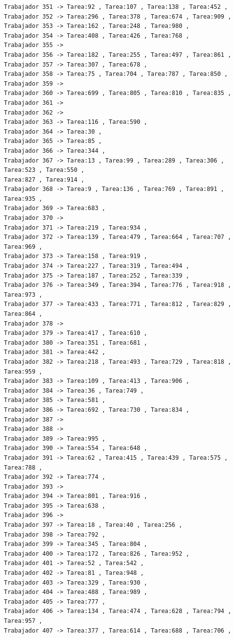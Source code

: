 \documentclass{article}
\begin{document}
\begin{lstlisting}
Trabajador 351 -> Tarea:92 , Tarea:107 , Tarea:138 , Tarea:452 , 
Trabajador 352 -> Tarea:296 , Tarea:378 , Tarea:674 , Tarea:909 , 
Trabajador 353 -> Tarea:162 , Tarea:248 , Tarea:980 , 
Trabajador 354 -> Tarea:408 , Tarea:426 , Tarea:768 , 
Trabajador 355 -> 
Trabajador 356 -> Tarea:182 , Tarea:255 , Tarea:497 , Tarea:861 , 
Trabajador 357 -> Tarea:307 , Tarea:678 , 
Trabajador 358 -> Tarea:75 , Tarea:704 , Tarea:787 , Tarea:850 , 
Trabajador 359 -> 
Trabajador 360 -> Tarea:699 , Tarea:805 , Tarea:810 , Tarea:835 , 
Trabajador 361 -> 
Trabajador 362 -> 
Trabajador 363 -> Tarea:116 , Tarea:590 , 
Trabajador 364 -> Tarea:30 , 
Trabajador 365 -> Tarea:85 , 
Trabajador 366 -> Tarea:344 , 
Trabajador 367 -> Tarea:13 , Tarea:99 , Tarea:289 , Tarea:306 , Tarea:523 , Tarea:550 , 
Tarea:827 , Tarea:914 , 
Trabajador 368 -> Tarea:9 , Tarea:136 , Tarea:769 , Tarea:891 , Tarea:935 , 
Trabajador 369 -> Tarea:683 , 
Trabajador 370 -> 
Trabajador 371 -> Tarea:219 , Tarea:934 , 
Trabajador 372 -> Tarea:139 , Tarea:479 , Tarea:664 , Tarea:707 , Tarea:969 , 
Trabajador 373 -> Tarea:158 , Tarea:919 , 
Trabajador 374 -> Tarea:227 , Tarea:319 , Tarea:494 , 
Trabajador 375 -> Tarea:187 , Tarea:252 , Tarea:339 , 
Trabajador 376 -> Tarea:349 , Tarea:394 , Tarea:776 , Tarea:918 , Tarea:973 , 
Trabajador 377 -> Tarea:433 , Tarea:771 , Tarea:812 , Tarea:829 , Tarea:864 , 
Trabajador 378 -> 
Trabajador 379 -> Tarea:417 , Tarea:610 , 
Trabajador 380 -> Tarea:351 , Tarea:681 , 
Trabajador 381 -> Tarea:442 , 
Trabajador 382 -> Tarea:218 , Tarea:493 , Tarea:729 , Tarea:818 , Tarea:959 , 
Trabajador 383 -> Tarea:109 , Tarea:413 , Tarea:906 , 
Trabajador 384 -> Tarea:36 , Tarea:749 , 
Trabajador 385 -> Tarea:581 , 
Trabajador 386 -> Tarea:692 , Tarea:730 , Tarea:834 , 
Trabajador 387 -> 
Trabajador 388 -> 
Trabajador 389 -> Tarea:995 , 
Trabajador 390 -> Tarea:554 , Tarea:648 , 
Trabajador 391 -> Tarea:62 , Tarea:415 , Tarea:439 , Tarea:575 , Tarea:788 , 
Trabajador 392 -> Tarea:774 , 
Trabajador 393 -> 
Trabajador 394 -> Tarea:801 , Tarea:916 , 
Trabajador 395 -> Tarea:638 , 
Trabajador 396 -> 
Trabajador 397 -> Tarea:18 , Tarea:40 , Tarea:256 , 
Trabajador 398 -> Tarea:792 , 
Trabajador 399 -> Tarea:345 , Tarea:804 , 
Trabajador 400 -> Tarea:172 , Tarea:826 , Tarea:952 , 
Trabajador 401 -> Tarea:52 , Tarea:542 , 
Trabajador 402 -> Tarea:81 , Tarea:948 , 
Trabajador 403 -> Tarea:329 , Tarea:930 , 
Trabajador 404 -> Tarea:488 , Tarea:989 , 
Trabajador 405 -> Tarea:777 , 
Trabajador 406 -> Tarea:134 , Tarea:474 , Tarea:628 , Tarea:794 , Tarea:957 , 
Trabajador 407 -> Tarea:377 , Tarea:614 , Tarea:688 , Tarea:706 , 

\end{lstlisting}
\end{document}
